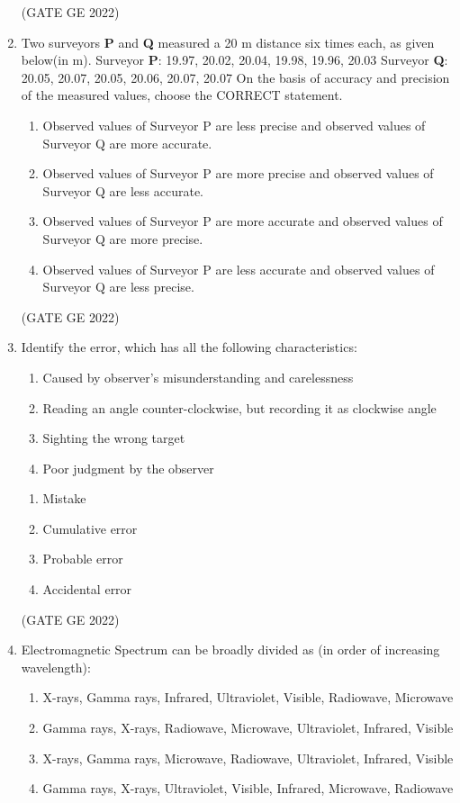 \documentclass[a4paper, 11pt]{article}
\begin{document}
\begin{enumerate}
\hfill (GATE GE 2022)

\item Two surveyors \textbf{P} and \textbf{Q} measured a 20 m distance six times each, as given below(in m).
Surveyor \textbf{P}: 19.97, 20.02, 20.04, 19.98, 19.96, 20.03
Surveyor \textbf{Q}: 20.05, 20.07, 20.05, 20.06, 20.07, 20.07
On the basis of accuracy and precision of the measured values, choose the CORRECT statement.
\begin{enumerate}
    \item Observed values of Surveyor P are less precise and observed values of Surveyor Q are more accurate. 
    \item Observed values of Surveyor P are more precise and observed values of Surveyor Q are less accurate.
    \item Observed values of Surveyor P are more accurate and observed values of Surveyor Q are more precise.
    \item Observed values of Surveyor P are less accurate and observed values of Surveyor Q are less precise.
\end{enumerate}

\hfill (GATE GE 2022)

\item Identify the error, which has all the following characteristics:
\begin{enumerate}[label=\alph*)]
\item Caused by observer’s misunderstanding and carelessness 
\item Reading an angle counter-clockwise, but recording it as clockwise angle 
\item Sighting the wrong target 
\item Poor judgment by the observer 
\end{enumerate}

\begin{enumerate}
    \item Mistake
    \item Cumulative error
    \item Probable error
    \item Accidental error
\end{enumerate}

\hfill (GATE GE 2022)

\item Electromagnetic Spectrum can be broadly divided as (in order of increasing wavelength):
\begin{enumerate}
    \item X-rays, Gamma rays, Infrared, Ultraviolet, Visible, Radiowave, Microwave
    \item Gamma rays, X-rays, Radiowave, Microwave, Ultraviolet, Infrared, Visible
    \item X-rays, Gamma rays, Microwave, Radiowave, Ultraviolet, Infrared, Visible
    \item Gamma rays, X-rays, Ultraviolet, Visible, Infrared, Microwave, Radiowave
\end{enumerate}


\end{enumerate}
\end{document}
